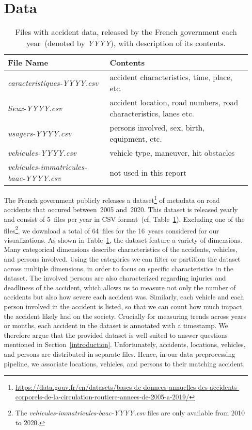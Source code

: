 \section{Data}
\label{data}
\begin{table}
    \caption{Files with accident data, released by the French government each year~(denoted by \textit{YYYY}), with description of its contents.}
    \label{table-files}
    \begin{tabularx}{\linewidth}{lX}
        \toprule
        \textbf{File Name} & \textbf{Contents} \\
        \midrule
        \textit{caracteristiques-YYYY.csv} & accident characteristics, time, place, etc. \\
        \textit{lieux-YYYY.csv} & accident location, road numbers, road characteristics, lanes etc. \\
        \textit{usagers-YYYY.csv} & persons involved, sex, birth, equipment, etc. \\
        \textit{vehicules-YYYY.csv} & vehicle type, maneuver, hit obstacles \\
        \textit{vehicules-immatricules-baac-YYYY.csv} & not used in this report \\
        \bottomrule
    \end{tabularx}
\end{table}
The French government publicly releases a dataset\footnote{\url{https://data.gouv.fr/en/datasets/bases-de-donnees-annuelles-des-accidents-corporels-de-la-circulation-routiere-annees-de-2005-a-2019/}} of  metadata on road accidents that occured between~2005 and~2020. This dataset is released yearly and consist of 5~files per year in CSV format~(cf. Table~\ref{table-files}). Excluding one of the files\footnote{The \textit{vehicules-immatricules-baac-YYYY.csv} files are only available from 2010 to 2020.}, we download a total of 64~files for the 16~years considered for our visualizations. As shown in  Table~\ref{table-files}, the dataset feature a variety of dimensions. Many categorical dimensions describe characteristics of the accidents, vehicles, and persons involved.
Using the categories we can filter or partition the dataset across multiple dimensions, in order to focus on specific characteristics in the dataset.
The involved persons are also characterized regarding injuries and deadliness of the accident, which allows us to measure not only the number of accidents but also how severe each accident was. Similarly, each vehicle and each person involved in the accident is listed, so that we can count how much impact the accident likely had on the society. Crucially for measuring trends across years or months, each accident in the dataset is annotated with a timestamp. We therefore argue that the provided dataset is well suited to answer questions mentioned in Section~\ref{introduction}. Unfortunately, accidents, locations, vehicles, and persons are distributed in separate files. Hence, in our data preprocessing pipeline, we associate locations, vehicles, and persons to their matching accident.

